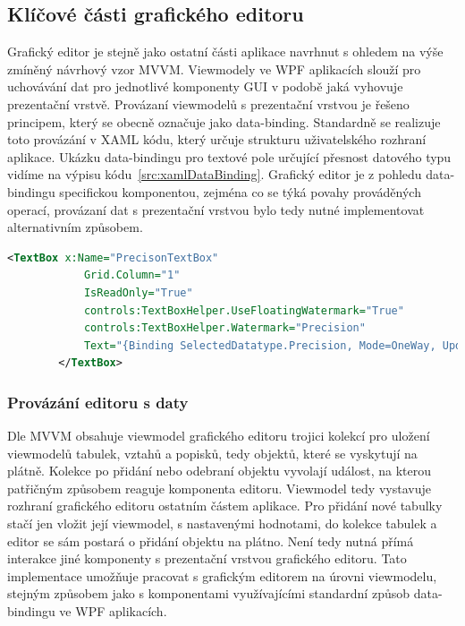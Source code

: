 \documentclass[czech,bachelor,public,dept460,male,oneside]{diploma}
\begin{document}
	\subsection{Klíčové části grafického editoru} \label{secKeyPartsEditor}
	Grafický editor je stejně jako ostatní části aplikace navrhnut s ohledem na výše zmíněný návrhový vzor MVVM. Viewmodely ve WPF aplikacích slouží pro uchovávání dat pro jednotlivé komponenty GUI v podobě jaká vyhovuje prezentační vrstvě. Provázaní viewmodelů s prezentační vrstvou je řešeno principem, který se obecně označuje jako data-binding. Standardně se realizuje toto provázání v XAML kódu, který určuje strukturu uživatelského rozhraní aplikace. Ukázku data-bindingu pro textové pole určující přesnost datového typu vidíme na výpisu kódu~\ref{src:xamlDataBinding}. Grafický editor je z pohledu data-bindingu specifickou komponentou, zejména co se týká povahy prováděných operací, provázaní dat s prezentační vrstvou bylo tedy nutné implementovat alternativním způsobem. 
		
		\begin{lstlisting}[language=xml,label=src:xamlDataBinding,caption=Příklad data-bindingu v XAML pro textové pole]
		<TextBox x:Name="PrecisonTextBox"
			Grid.Column="1"
			IsReadOnly="True"
			controls:TextBoxHelper.UseFloatingWatermark="True"
			controls:TextBoxHelper.Watermark="Precision"
			Text="{Binding SelectedDatatype.Precision, Mode=OneWay, UpdateSourceTrigger=PropertyChanged}">
		</TextBox>
		\end{lstlisting}
		
		\subsubsection{Provázání editoru s daty}
		Dle MVVM obsahuje viewmodel grafického editoru trojici kolekcí pro uložení viewmodelů tabulek, vztahů a popisků, tedy objektů, které se vyskytují na plátně. Kolekce po přidání nebo odebraní objektu vyvolají událost, na kterou patřičným způsobem reaguje komponenta editoru. Viewmodel tedy vystavuje rozhraní grafického editoru ostatním částem aplikace. Pro přidání nové tabulky stačí jen vložit její viewmodel, s nastavenými hodnotami, do kolekce tabulek a editor se sám postará o přidání objektu na plátno. Není tedy nutná přímá interakce jiné komponenty s prezentační vrstvou grafického editoru. Tato implementace umožňuje pracovat s grafickým editorem na úrovni viewmodelu, stejným způsobem jako s komponentami využívajícími standardní způsob data-bindingu ve WPF aplikacích. 
		
\end{document}
